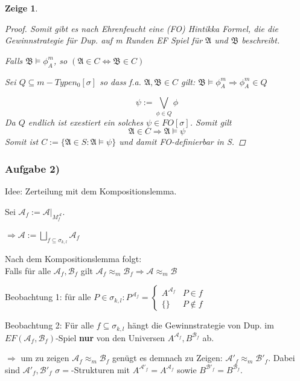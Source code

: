 \documentclass[12pt]{article}
\newtheorem{zeige}{Zeige}
\begin{document}
\begin{zeige}
\begin{proof}
  Somit gibt es nach Ehrenfeucht eine (FO) Hintikka Formel, die die Gewinnstrategie für Dup. auf m Runden EF Spiel für $\mathfrak{A}$ und $\mathfrak{B}$ beschreibt.
  

  \begin{center}
    Falls $\mathfrak{B} \models \phi^m_{A}$, so $(\mathfrak{A}\in C \Leftrightarrow \mathfrak{B}\in C )$
  \end{center}

  Sei $Q\subseteq m-Typen_0[\sigma]$ so dass f.a. $\mathfrak{A},\mathfrak{B}\in C$ gilt: $\mathfrak{B} \models \phi^m_{A} \Rightarrow \phi^m_{A}\in Q$
  
  \[ \psi := \bigvee_{\phi \in Q} \phi \] 
  Da $Q$ endlich ist exestiert ein solches $\psi\in FO[\sigma]$.
  Somit gilt 
  $$ \mathfrak{A}\in C \Rightarrow \mathfrak{A} \models \psi $$
  Somit ist $C:=\{\mathfrak{A}\in S: \mathfrak{A}\models \psi\}$ und damit FO-definierbar in S.

  
  
  
\end{proof}
\end{zeige}

\subsubsection*{Aufgabe 2)}
Idee: Zerteilung mit dem Kompositionslemma.

Sei $\mathcal{A}_f := \left. \mathcal{A} \right|_{M_f^{\mathcal{A}}}$.

$\Rightarrow \mathcal{A} := \bigsqcup_{ f\subseteq \sigma_{k, l } } \mathcal{A}_f$

Nach dem Kompositionslemma folgt: \\

Falls für alle $\mathcal{A}_f,\mathcal{B}_f$ gilt $\mathcal{A}_f \approx_m \mathcal{B}_f \Rightarrow \mathcal{A} \approx_m \mathcal{B}$

Beobachtung 1: für alle $P\in\sigma_{k, l}: P^{\mathcal{A}_f}=
\begin{cases}
 A^{\mathcal{A}_f}&P\in f\\
 \{\}&P\notin f
\end{cases}$

Beobachtung 2: Für alle $f\subseteq \sigma_{k, l}$ hängt die Gewinnstrategie von Dup. im $EF(\mathcal{A}_f,\mathcal{B}_f)$-Spiel \textbf{nur} von den Universen $A^{ \mathcal{A}_f },B^{ \mathcal{B}_f }$ ab.

$\Rightarrow$ um zu zeigen $\mathcal{A}_f \approx_m \mathcal{B}_f$ genügt es demnach zu Zeigen: $\mathcal{A}'_f \approx_m \mathcal{B}'_f$. Dabei sind $\mathcal{A}'_f,\mathcal{B}'_f$ $\sigma={}$-Strukturen mit $A^{ \mathcal{A}'_f } = A^{ \mathcal{A}_f }$ sowie $B^{ \mathcal{B}'_f } = B^{ \mathcal{B}_f }$.
\end{document}

